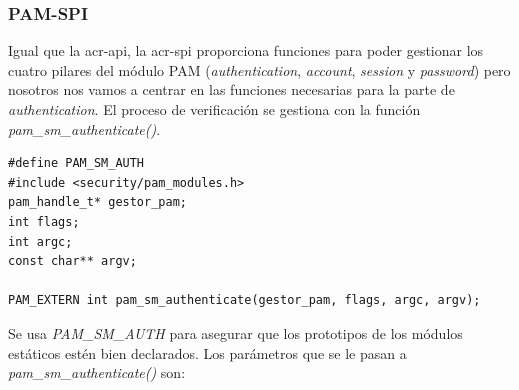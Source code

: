 \documentclass[twoside, titlepage, 12pt, a4paper]{article}
\begin{document}
\subsubsection{PAM-SPI}
Igual que la \gls{acr-api}, la \gls{acr-spi} proporciona funciones para poder gestionar los cuatro pilares del módulo PAM (\textit{authentication}, \textit{account}, \textit{session} y \textit{password}) pero nosotros nos vamos a centrar en las funciones necesarias para la parte de \textit{authentication}. El proceso de verificación se gestiona con la función \textit{pam\_sm\_authenticate()}.
\begin{lstlisting}
#define PAM_SM_AUTH
#include <security/pam_modules.h>
pam_handle_t* gestor_pam;
int flags;
int argc;
const char** argv;

PAM_EXTERN int pam_sm_authenticate(gestor_pam, flags, argc, argv);
\end{lstlisting}
Se usa \textit{PAM\_SM\_AUTH} para asegurar que los prototipos de los módulos estáticos estén bien declarados.
Los parámetros que se le pasan a \textit{pam\_sm\_authenticate()} son: 
\end{document}
